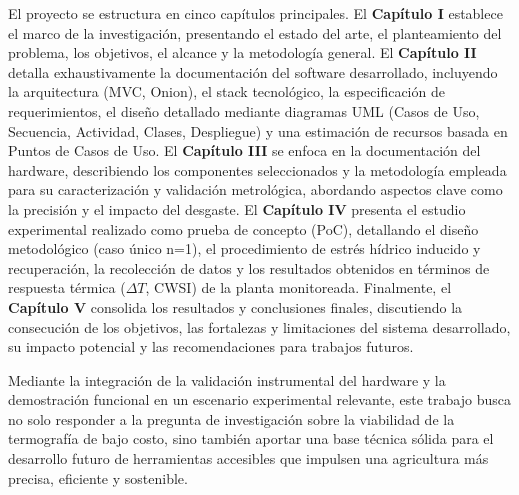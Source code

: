 \documentclass[12pt,openright,oneside]{book}
\begin{document}
El proyecto se estructura en cinco capítulos principales. El \textbf{Capítulo I} establece el marco de la investigación, presentando el estado del arte, el planteamiento del problema, los objetivos, el alcance y la metodología general. El \textbf{Capítulo II} detalla exhaustivamente la documentación del software desarrollado, incluyendo la arquitectura (MVC, Onion), el stack tecnológico, la especificación de requerimientos, el diseño detallado mediante diagramas UML (Casos de Uso, Secuencia, Actividad, Clases, Despliegue) y una estimación de recursos basada en Puntos de Casos de Uso. El \textbf{Capítulo III} se enfoca en la documentación del hardware, describiendo los componentes seleccionados y la metodología empleada para su caracterización y validación metrológica, abordando aspectos clave como la precisión y el impacto del desgaste. El \textbf{Capítulo IV} presenta el estudio experimental realizado como prueba de concepto (PoC), detallando el diseño metodológico (caso único n=1), el procedimiento de estrés hídrico inducido y recuperación, la recolección de datos y los resultados obtenidos en términos de respuesta térmica ($\Delta T$, CWSI) de la planta monitoreada. Finalmente, el \textbf{Capítulo V} consolida los resultados y conclusiones finales, discutiendo la consecución de los objetivos, las fortalezas y limitaciones del sistema desarrollado, su impacto potencial y las recomendaciones para trabajos futuros.

Mediante la integración de la validación instrumental del hardware y la demostración funcional en un escenario experimental relevante, este trabajo busca no solo responder a la pregunta de investigación sobre la viabilidad de la termografía de bajo costo, sino también aportar una base técnica sólida para el desarrollo futuro de herramientas accesibles que impulsen una agricultura más precisa, eficiente y sostenible.

\cleardoublepage
{} %
\setcounter{page}{1} %

\mainmatter
\setcounter{page}{1}




\end{document}
